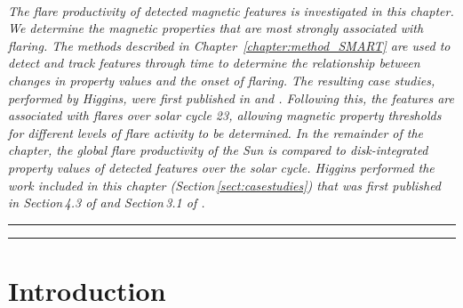\\ {\it 
The flare productivity of detected magnetic features is investigated in this chapter. We determine the magnetic properties that are most strongly associated with flaring. The methods described in Chapter~\ref{chapter:method_SMART} are used to detect and track features through time to determine the relationship between changes in property values and the onset of flaring. The resulting case studies, performed by Higgins, were first published in \emph{} and \emph{}. Following this, the features are associated with flares over solar cycle 23, allowing magnetic property thresholds for different levels of flare activity to be determined. In the remainder of the chapter, the global flare productivity of the Sun is compared to disk-integrated property values of detected features over the solar cycle. Higgins performed the work included in this chapter (Section\,\ref{sect:casestudies}) that was first published in  Section\,4.3 of \emph{ and Section\,3.1 of \emph{}.
} \\ 
\hrule height 0.4mm
\vspace{0.5mm}
\hrule height 1mm 
\vspace{1.5cm}


\section{Introduction}

}
